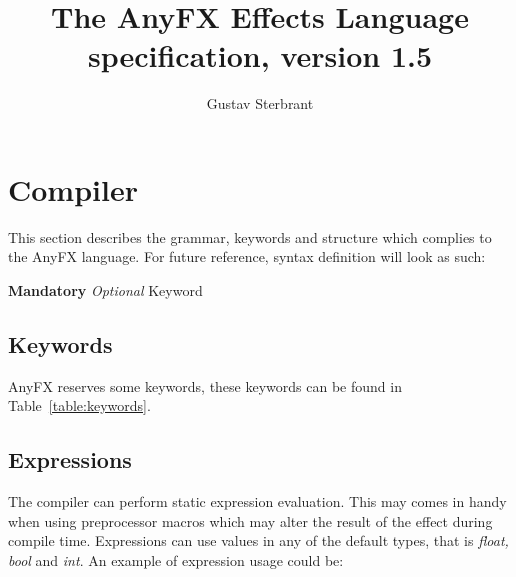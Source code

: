 \documentclass{article}
\newcommand{\SyntaxBox}[1]
{	
	\begin{center}
	\colorbox{orange!60}
	{
		\begin{minipage}{\linewidth}
		\hfill
		\begin{tabbing}
		#1
		\end{tabbing}
		\end{minipage}
	}
	\end{center}
}
\begin{document}
\title{The AnyFX Effects Language specification, version 1.5}
\author{Gustav Sterbrant}
\date{}
\maketitle

\clearpage
\tableofcontents
\clearpage

\section{Compiler}
This section describes the grammar, keywords and structure which complies to the AnyFX language. For future reference, syntax definition will look as such:

\SyntaxBox
{
	\textbf{Mandatory} \textit{Optional} Keyword
}

\subsection{Keywords}
AnyFX reserves some keywords, these keywords can be found in Table~\ref{table:keywords}.

\begin{table}[hp]
\centering
\caption{Keywords}
\label{table:keywords}
\end{table}

\subsection{Expressions}
The compiler can perform static expression evaluation. This may comes in handy when using preprocessor macros which may alter the result of the effect during compile time. Expressions can use values in any of the default types, that is \textit{float, bool} and \textit{int}. An example of expression usage could be:
\end{document}
